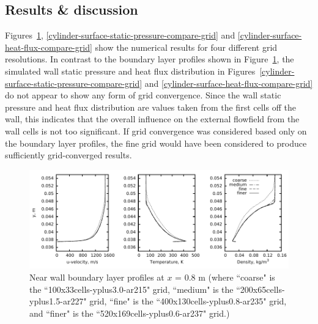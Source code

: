\subsection{Results \& discussion}
%
Figures~\ref{cylinder-bl-profiles}, \ref{cylinder-surface-static-pressure-compare-grid} 
and \ref{cylinder-surface-heat-flux-compare-grid} show the numerical results for 
four different grid resolutions. In contrast to the boundary layer profiles shown 
in Figure~\ref{cylinder-bl-profiles}, the simulated wall static pressure and heat 
flux distribution in Figures~\ref{cylinder-surface-static-pressure-compare-grid} and 
\ref{cylinder-surface-heat-flux-compare-grid} 
do not appear to show any form of grid convergence. Since the wall static pressure 
and heat flux distribution are values taken from the first cells off the wall, this 
indicates that the overall influence on the external flowfield from the wall cells is 
not too significant. If grid convergence was considered based only on the boundary 
layer profiles, the fine grid would have been considered to produce sufficiently 
grid-converged results.
%
\begin{figure}[h]
 \begin{center}
  \includegraphics[width=15cm]{./chap3-mallinson-cylinder/figs/boundary-layer-profile-800mm.pdf}
 \end{center}
 \caption{Near wall boundary layer profiles at $x$ = 0.8 m 
          (where ``coarse" is the ``100x33cells-yplus3.0-ar215" grid, 
          ``medium" is the ``200x65cells-yplus1.5-ar227" grid,
          ``fine" is the ``400x130cells-yplus0.8-ar235" grid, and
          ``finer" is the ``520x169cells-yplus0.6-ar237" grid.)}
 \label{cylinder-bl-profiles}
\end{figure}
